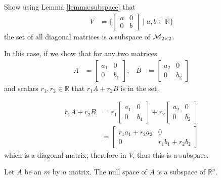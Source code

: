 \begin{example}  \label{eq:example:diag:matrix}
Show using Lemma \ref{lemma:subspace} that 
%
\begin{align*}
V& =\{ \begin{bmatrix}
a & 0 \\
0 & b 
\end{bmatrix} \; | \; a,b \in \mathbb{R} \}
\end{align*}
the set of all diagonal matrices is a subspace of ${\cal M}_{2 \times 2}$.  

\solution 

In this case, if we show that for any two matrices
\begin{align*}
A & = \begin{bmatrix}
a_1 & 0 \\
0 & b_1 
\end{bmatrix}, & B & = \begin{bmatrix}
a_2 & 0 \\
0 & b_2
\end{bmatrix} 
\end{align*} and scalars $r_1, r_2 \in \mathbb{R}$ that  $r_1 A + r_2 B$ is in the set. 

\begin{align*}
r_1 A + r_2 B & = r_1 \begin{bmatrix}
a_1 & 0 \\
0 & b_1 
\end{bmatrix}+ r_2 \begin{bmatrix}
a_2 & 0 \\
0 & b_2
\end{bmatrix} \\
& = \begin{bmatrix}
r_1 a_1 + r_2 a_2 & 0 \\
0 & r_1 b_1 + r_2 b_2 
\end{bmatrix}
\end{align*} 
which is a diagonal matrix, therefore in $V$, thus this is a subspace.  
\end{example}

\begin{lemma}
Let $A$ be an $m$ by $n$ matrix.  The null space of $A$ is a subspace of $\mathbb{R}^n$.  

\end{lemma}


